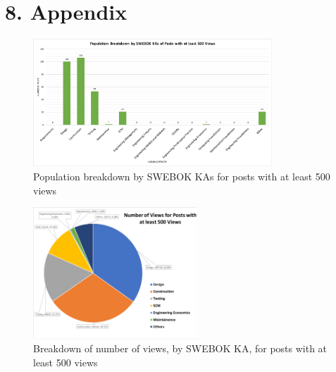\documentclass{sigchi}
\begin{document}
\section {8. Appendix}
\begin{figure}[ht] %
	\centering %
	\includegraphics[width=0.8\textwidth,height=0.7\textheight,keepaspectratio]{RQ1_Size_of_Each_SWEBOK_Cat.png}%
    \caption{Population breakdown by SWEBOK KAs for posts with at least 500 views}
    \label{fig:1PopulationBreakDownSwebok}
\end{figure}
\begin{figure}[ht]
	\centering
\includegraphics[width=0.55\textwidth,height=0.55\textheight,keepaspectratio]{RQ2_NumViewsPostsAll.png}
    \caption{Breakdown of number of views, by SWEBOK KA, for posts with at least 500 views}
    \label{fig:2ViewBreakDownSwebok}
\end{figure}
\pagebreak
\end{document}

